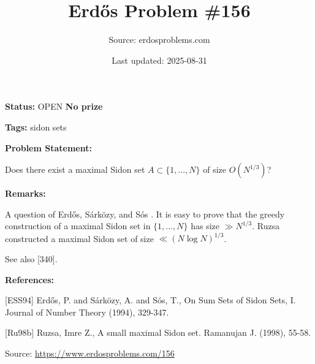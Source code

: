 \documentclass{article}
\title{Erd\H{o}s Problem \#156}
\date{Last updated: 2025-08-31}
\author{Source: erdosproblems.com}
\begin{document}
\maketitle

\noindent\textbf{Status:} OPEN \quad \textbf{No prize}

\noindent\textbf{Tags:} sidon sets

\medskip
\noindent\textbf{Problem Statement:}

Does there exist a maximal Sidon set $A\subset \{1,\ldots,N\}$ of size $O(N^{1/3})$?

\bigskip
\noindent\textbf{Remarks:}

A question of Erd\H{o}s, S\'{a}rk\"{o}zy, and S\'{o}s \cite{ESS94}. It is easy to prove that the greedy construction of a maximal Sidon set in $\{1,\ldots,N\}$ has size $\gg N^{1/3}$. Ruzsa \cite{Ru98b} constructed a maximal Sidon set of size $\ll (N\log N)^{1/3}$.

See also [340].

\bigskip
\noindent\textbf{References:}

[ESS94] Erd\H{o}s, P. and S\'{a}rk\"{o}zy, A. and S\'{o}s, T., On Sum Sets of Sidon Sets, I. Journal of Number Theory (1994), 329-347.
 
 [Ru98b] Ruzsa, Imre Z., A small maximal Sidon set. Ramanujan J. (1998), 55-58.

\bigskip
\noindent\small{Source: \url{https://www.erdosproblems.com/156}}
\end{document}
